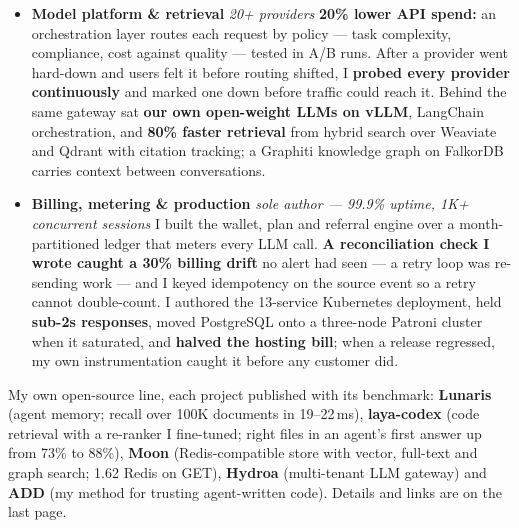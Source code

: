 \documentclass[10pt,a4paper,ragged2e,withhyper]{altacv}
\newcommand{\proj}[2]{\textbf{#1} \textcolor{accent}{\textbullet} \textit{#2}\newline}
\newcommand{\stack}[1]{\newline{\scriptsize\textcolor{emphasis}{#1}}}
\newcommand{\win}[1]{\textbf{\textcolor{emphasis}{#1}}}
\begin{document}
\begin{itemize}[itemsep=4pt,topsep=3pt,parsep=0pt]
  \item \proj{Model platform \& retrieval}{20+ providers}
  \win{20\% lower API spend:} an orchestration layer routes each request by policy --- task complexity, compliance, cost against quality --- tested in A/B runs. After a provider went hard-down and users felt it before routing shifted, I \win{probed every provider continuously} and marked one down before traffic could reach it. Behind the same gateway sat \win{our own open-weight LLMs on vLLM}, LangChain orchestration, and \win{80\% faster retrieval} from hybrid search over Weaviate and Qdrant with citation tracking; a Graphiti knowledge graph on FalkorDB carries context between conversations.
  \stack{Python · FastAPI · LangChain · vLLM · Weaviate · Qdrant · FalkorDB · Graphiti · ComfyUI · Replicate · fal.ai · ElevenLabs}

  \item \proj{Billing, metering \& production}{sole author --- 99.9\% uptime, 1K+ concurrent sessions}
  I built the wallet, plan and referral engine over a month-partitioned ledger that meters every LLM call. \win{A reconciliation check I wrote caught a 30\% billing drift} no alert had seen --- a retry loop was re-sending work --- and I keyed idempotency on the source event so a retry cannot double-count. I authored the 13-service Kubernetes deployment, held \win{sub-2s responses}, moved PostgreSQL onto a three-node Patroni cluster when it saturated, and \win{halved the hosting bill}; when a release regressed, my own instrumentation caught it before any customer did.
  \stack{Python · FastAPI · PostgreSQL (partitioned, Patroni) · Redis · Kubernetes · Helm · Azure · Prometheus · Next.js 14}
\end{itemize}

\newpage


\begin{minipage}{\linewidth}
\justifying
My own open-source line, each project published with its benchmark: \win{Lunaris} (agent memory; recall over 100K documents in 19--22\,ms), \win{laya-codex} (code retrieval with a re-ranker I fine-tuned; right files in an agent's first answer up from 73\% to 88\%), \win{Moon} (Redis-compatible store with vector, full-text and graph search; 1.62\texttimes{} Redis on GET), \win{Hydroa} (multi-tenant LLM gateway) and \win{ADD} (my method for trusting agent-written code). Details and links are on the last page.
\end{minipage}
\end{document}
